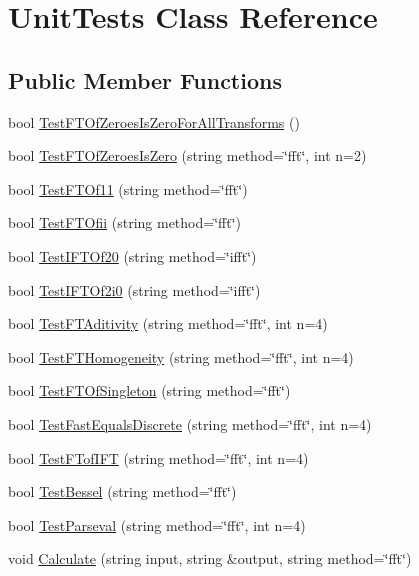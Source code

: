 \hypertarget{class_unit_tests}{\section{Unit\-Tests Class Reference}
\label{class_unit_tests}
}
\subsection*{Public Member Functions}
\begin{DoxyCompactItemize}
\item 
bool \hyperlink{class_unit_tests_a4c3928bdbdd51175a3be610b3c3187ea}{Test\-F\-T\-Of\-Zeroes\-Is\-Zero\-For\-All\-Transforms} ()
\item 
bool \hyperlink{class_unit_tests_abc9e7ad8c6a613d446fa97454d5a28d3}{Test\-F\-T\-Of\-Zeroes\-Is\-Zero} (string method=\char`\"{}fft\char`\"{}, int n=2)
\item 
bool \hyperlink{class_unit_tests_ac9473eec7ae1acd4940eb5878c180280}{Test\-F\-T\-Of11} (string method=\char`\"{}fft\char`\"{})
\item 
bool \hyperlink{class_unit_tests_a65de7fbb8a1287344dfe07078422b35c}{Test\-F\-T\-Ofii} (string method=\char`\"{}fft\char`\"{})
\item 
bool \hyperlink{class_unit_tests_ae555e8cd5726fbd2e87ce74739f88ce3}{Test\-I\-F\-T\-Of20} (string method=\char`\"{}ifft\char`\"{})
\item 
bool \hyperlink{class_unit_tests_a2b5e389c80f71e000ab94a852037ae92}{Test\-I\-F\-T\-Of2i0} (string method=\char`\"{}ifft\char`\"{})
\item 
bool \hyperlink{class_unit_tests_a14a84ce884b12d7b46bc9324196d0d08}{Test\-F\-T\-Aditivity} (string method=\char`\"{}fft\char`\"{}, int n=4)
\item 
bool \hyperlink{class_unit_tests_a21ee9f0d7934a9ec8482cd20149f0f83}{Test\-F\-T\-Homogeneity} (string method=\char`\"{}fft\char`\"{}, int n=4)
\item 
bool \hyperlink{class_unit_tests_a02bbd4899cfef5f8fd9524eb0215d01b}{Test\-F\-T\-Of\-Singleton} (string method=\char`\"{}fft\char`\"{})
\item 
bool \hyperlink{class_unit_tests_aafe699eafa16f54e73a403711ab0bca4}{Test\-Fast\-Equals\-Discrete} (string method=\char`\"{}fft\char`\"{}, int n=4)
\item 
bool \hyperlink{class_unit_tests_a27d62a154963fa472fdc48a19348726e}{Test\-F\-Tof\-I\-F\-T} (string method=\char`\"{}fft\char`\"{}, int n=4)
\item 
bool \hyperlink{class_unit_tests_a338df9542c1644660ce82e941b9978d1}{Test\-Bessel} (string method=\char`\"{}fft\char`\"{})
\item 
bool \hyperlink{class_unit_tests_a53387897e63162138a11828f243eaa0e}{Test\-Parseval} (string method=\char`\"{}fft\char`\"{}, int n=4)
\item 
void \hyperlink{class_unit_tests_a4e5ad3f2d8f023d0b6d593291338b359}{Calculate} (string input, string \&output, string method=\char`\"{}fft\char`\"{})
\end{DoxyCompactItemize}



